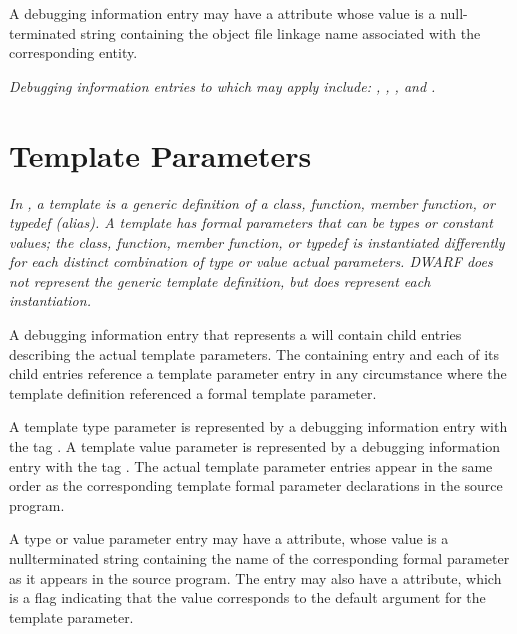 A debugging information entry may have 
a 
\DWATlinkagename{}
attribute whose value is a null-terminated string containing the 
object file linkage name associated with the corresponding entity.

\textit{Debugging information entries to which \DWATlinkagename{}
may apply include: \DWTAGcommonblock, \DWTAGconstant,
\DWTAGentrypoint, \DWTAGsubprogram{} 
and \DWTAGvariable.
}

\section{Template Parameters}
\label{chap:templateparameters}
\textit{In , a template is a generic definition of a class, function, member
function, or typedef (alias).  A template has formal parameters that
can be types or constant values; the class, function,
member function, or typedef is instantiated differently for each
distinct combination of type or value actual parameters.  DWARF does
not represent the generic template definition, but does represent each
instantiation.
}

A debugging information entry that represents a 
will contain child entries describing the actual template parameters.
The containing entry and each of its child entries reference a template
parameter entry in any circumstance where the template definition
referenced a formal template parameter.

A template type parameter is represented by a debugging information
entry with the tag
\DWTAGtemplatetypeparameterTARG. 
A template value parameter is represented by a debugging information
entry with the tag
\DWTAGtemplatevalueparameterTARG.
The actual template parameter entries appear in the same order as the 
corresponding template formal parameter declarations in the 
source program.

A type or value parameter entry may have a \DWATname{} attribute, 
whose value is a
null\dash terminated string containing the name of the corresponding 
formal parameter as it appears in the source program.
The entry may also have a 
\DWATdefaultvalue{} attribute, which is a flag indicating 
that the value corresponds to the default argument for the 
template parameter.

